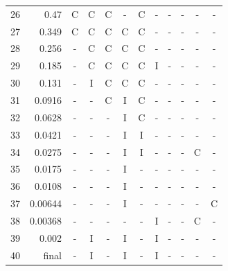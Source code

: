 \begin{tabular}{rrcccccccccc}
26 & 0.47 & C & C & C & - & C & - & - & - & - & - \\
27 & 0.349 & C & C & C & C & C & - & - & - & - & - \\
28 & 0.256 & - & C & C & C & C & - & - & - & - & - \\
29 & 0.185 & - & C & C & C & C & I & - & - & - & - \\
30 & 0.131 & - & I & C & C & C & - & - & - & - & - \\
31 & 0.0916 & - & - & C & I & C & - & - & - & - & - \\
32 & 0.0628 & - & - & - & I & C & - & - & - & - & - \\
33 & 0.0421 & - & - & - & I & I & - & - & - & - & - \\
34 & 0.0275 & - & - & - & I & I & - & - & - & C & - \\
35 & 0.0175 & - & - & - & I & - & - & - & - & - & - \\
36 & 0.0108 & - & - & - & I & - & - & - & - & - & - \\
37 & 0.00644 & - & - & - & I & - & - & - & - & - & C \\
38 & 0.00368 & - & - & - & - & - & I & - & - & C & - \\
39 & 0.002 & - & I & - & I & - & I & - & - & - & - \\
40 & final & - & I & - & I & - & I & - & - & - & - \\
\bottomrule
\end{tabular}
